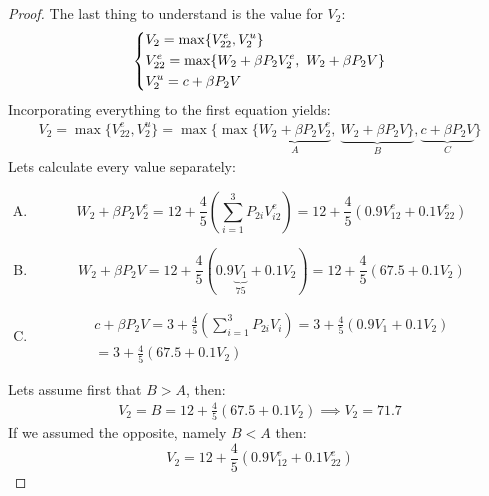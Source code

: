 \documentclass[12pt,reqno]{amsart}
\theoremstyle{plain}
\begin{document}
\begin{proof}
    The last thing to understand is the value for $ V_2 $:
    \[
        \begin{dcases*}
            V_2 = \max \{ V_{22}^{e}, V_{2}^{u} \} \\
            V_{22}^{e} = \max \{ W_{2} + \beta P_{2}V^{e}_{2}, ~W_{2} + \beta P_{2}V  \} \\
            V_{2}^{u} = c + \beta P_{2}V
        \end{dcases*}
    \]
    Incorporating everything to the first equation yields:
    \begin{gather*}
        V_2 = \max\{V_{22}^{e}, V_{2}^{u} \} = \max\{\max \{ \underbrace{W_{2} + \beta P_{2}V^{e}_{2}}_{A}, ~\underbrace{W_{2} + \beta P_{2}V  \}}_{B} , \underbrace{c + \beta P_{2}V}_{C} \}
    \end{gather*}
    Lets calculate every value separately:
    \begin{enumerate}[(A)]
        \item
              \[
                  W_{2} + \beta P_{2}V^{e}_{2} = 12 + \frac{4}{5} \left( \sum_{i=1}^{3}P_{2i}V_{i2}^{e}
                  \right) = 12 + \frac{4}{5} \left(  0.9 V_{12}^{e} + 0.1 V_{22}^{e} \right)
              \]
        \item
              \[
                  W_{2} + \beta P_{2}V = 12 + \frac{4}{5}\left( 0.9\underbrace{V_{1}}_{75} + 0.1V_2 \right) =
                  12 + \frac{4}{5}\left( 67.5 + 0.1 V_2 \right)
              \]
        \item
              \begin{gather*}
                  c + \beta P_{2}V = 3 + \frac{4}{5} \left( \sum_{i=1}^{3}P_{2i}V_{i} \right) = 3 +
                  \frac{4}{5} \left( 0.9 V_1 + 0.1 V_2 \right)\\ = 3 + \frac{4}{5}\left( 67.5 + 0.1V_2 \right)
              \end{gather*}
    \end{enumerate}
    Lets assume first that $ B > A $, then:
    \begin{gather}
        V_2 = B = 12 + \frac{4}{5} \left( 67.5 + 0.1V_2\right) \implies V_2 = 71.7
    \end{gather}
    If we assumed the opposite, namely $ B < A $ then:
    \[V_2 = 12 + \frac{4}{5} \left(  0.9 V_{12}^{e} + 0.1 V_{22}^{e} \right)\]


\end{proof}
\end{document}
